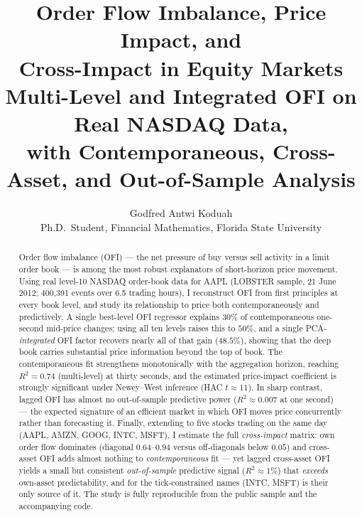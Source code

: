 \documentclass[11pt]{article}
\title{\textbf{Order Flow Imbalance, Price Impact, and\\ Cross-Impact in Equity Markets}\\[3pt]
\large Multi-Level and Integrated OFI on Real NASDAQ Data,\\
with Contemporaneous, Cross-Asset, and Out-of-Sample Analysis}
\author{Godfred Antwi Koduah\\
\small Ph.D.\ Student, Financial Mathematics, Florida State University}
\date{}
\begin{document}
\maketitle

\begin{abstract}
\noindent Order flow imbalance (OFI) --- the net pressure of buy versus sell
activity in a limit order book --- is among the most robust explanators of
short-horizon price movement. Using real level-10 NASDAQ order-book data for AAPL
(LOBSTER sample, 21 June 2012; 400{,}391 events over 6.5 trading hours), I
reconstruct OFI from first principles at every book level, and study its
relationship to price both contemporaneously and predictively. A single
best-level OFI regressor explains $30\%$ of contemporaneous one-second mid-price
changes; using all ten levels raises this to $50\%$, and a single
PCA-\emph{integrated} OFI factor recovers nearly all of that gain ($48.5\%$),
showing that the deep book carries substantial price information beyond the top of
book. The contemporaneous fit strengthens monotonically with the aggregation
horizon, reaching $R^2=0.74$ (multi-level) at thirty seconds, and the estimated
price-impact coefficient is strongly significant under Newey--West inference
(HAC $t\approx 11$). In sharp contrast, lagged OFI has almost no out-of-sample
predictive power ($R^2\approx 0.007$ at one second) --- the expected signature of
an efficient market in which OFI moves price concurrently rather than forecasting
it. Finally, extending to five stocks trading on the same day (AAPL, AMZN, GOOG,
INTC, MSFT), I estimate the full \emph{cross-impact} matrix: own order flow
dominates (diagonal $0.64$--$0.94$ versus off-diagonals below $0.05$) and
cross-asset OFI adds almost nothing to \emph{contemporaneous} fit --- yet lagged
cross-asset OFI yields a small but consistent \emph{out-of-sample} predictive
signal ($R^2\approx 1\%$) that \emph{exceeds} own-asset predictability, and for the
tick-constrained names (INTC, MSFT) is their only source of it. The study is fully
reproducible from the public sample and the accompanying code.
\end{abstract}

\tableofcontents
\bigskip
\end{document}
